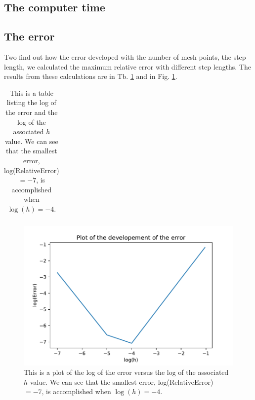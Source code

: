 \subsection{The computer time}

\subsection{The error}

Two find out how the error developed with the number of mesh points, the step length, we calculated the maximum relative error with different step lengths. The results from these calculations are in Tb. \ref{tab:error_developement} and in Fig. \ref{fig:error_development}. 

\begin{table}[H]\caption{This is a table listing the log of the error and the log of the associated $h$ value. We can see that the smallest error, log(RelativeError) $= -7$, is accomplished when $\log(h) = -4$.}\label{tab:error_developement}
\begin{tabular}{cc}

\end{tabular}
\end{table}

\begin{figure}[H]
\includegraphics[width=\linewidth]{figures/ErrorDevelopement.pdf}\caption{This is a plot of the log of the error versus the log of the associated $h$ value. We can see that the smallest error, log(RelativeError) $= -7$, is accomplished when $\log(h) = -4$.}\label{fig:error_development}
\end{figure}

